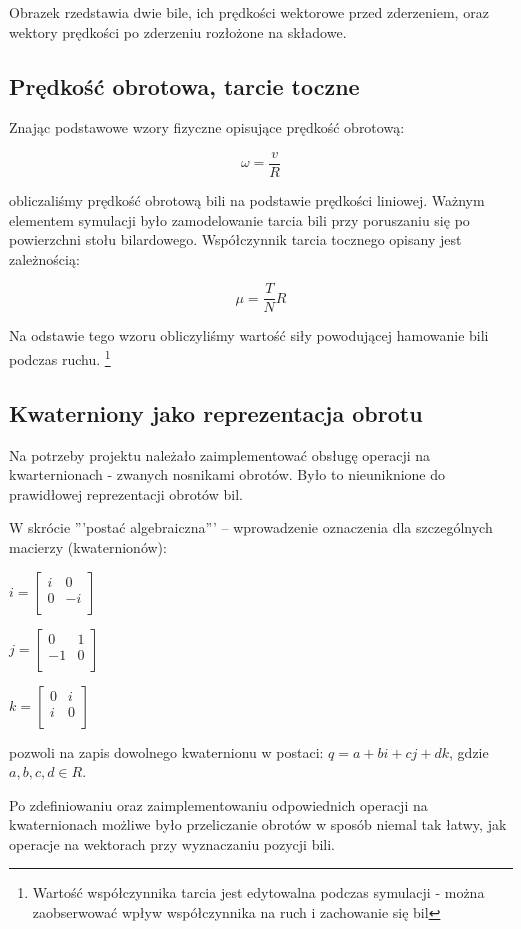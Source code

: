 Obrazek rzedstawia dwie bile, ich prędkości wektorowe przed zderzeniem, oraz wektory prędkości po zderzeniu rozłożone
na składowe.

\subsection{Prędkość obrotowa, tarcie toczne}

Znając podstawowe wzory fizyczne opisujące prędkość obrotową:

\begin{equation}
\omega = \frac{v}{R}
\end{equation}

obliczaliśmy prędkość obrotową bili na podstawie prędkości liniowej. Ważnym elementem symulacji było 
zamodelowanie tarcia bili przy poruszaniu się po powierzchni stołu bilardowego. Współczynnik tarcia tocznego 
opisany jest zależnością:

\begin{equation}
\mu = \frac{T}{N}R
\end{equation}

Na odstawie tego wzoru obliczyliśmy wartość siły powodującej hamowanie bili podczas ruchu.
\footnote{Wartość współczynnika tarcia jest edytowalna podczas symulacji - można zaobserwować wpływ 
współczynnika na ruch i zachowanie się bil}

\subsection{Kwaterniony jako reprezentacja obrotu}

Na potrzeby projektu należało zaimplementować obsługę operacji na kwarternionach - zwanych nosnikami obrotów.
Było to nieuniknione do prawidłowej reprezentacji obrotów bil.

W skrócie '''postać algebraiczna''' – wprowadzenie oznaczenia dla szczególnych macierzy (kwaternionów):


$i = \left[ \begin{array}{ccc}
i & 0 \\
0 & -i \\
\end{array}
\right]$

$j = \left[ \begin{array}{ccc}
0 & 1 \\
-1 & 0 \\
\end{array}
\right]$

$k = \left[ \begin{array}{ccc}
0 & i \\
i & 0 \\
\end{array}
\right]$

pozwoli na zapis dowolnego kwaternionu w postaci: $q=a+bi+cj+dk$, gdzie $a, b, c, d \in R$.

Po zdefiniowaniu oraz zaimplementowaniu odpowiednich operacji na kwaternionach możliwe było
przeliczanie obrotów w sposób niemal tak łatwy, jak operacje na wektorach przy wyznaczaniu pozycji bili.
